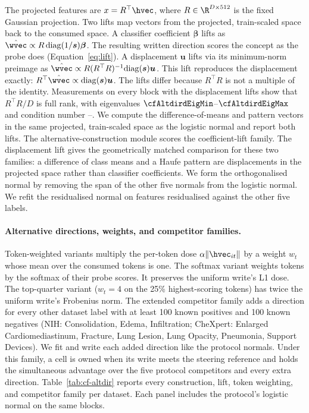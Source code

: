 \documentclass{article}
\begin{document}
The projected features are $x=R^{\top}\hvec$, where $R\in\R^{D\times512}$ is the fixed Gaussian projection. Two lifts map vectors from the projected, train-scaled space back to the consumed space. A classifier coefficient $\boldsymbol\beta$ lifts as $\hat\wvec\propto R\,\mathrm{diag}(1/\boldsymbol s)\boldsymbol\beta$. The resulting written direction scores the concept as the probe does (Equation~\ref{eq:lift}). A displacement $\boldsymbol u$ lifts via its minimum-norm preimage as $\hat\wvec\propto R(R^{\top}R)^{-1}\mathrm{diag}(\boldsymbol s)\boldsymbol u$. This lift reproduces the displacement exactly: $R^{\top}\hat\wvec\propto\mathrm{diag}(\boldsymbol s)\boldsymbol u$. The lifts differ because $R^{\top}R$ is not a multiple of the identity. Measurements on every block with the displacement lifts show that $R^{\top}R/D$ is full rank, with eigenvalues $\cfAltdirdEigMin$--$\cfAltdirdEigMax$ and condition number \cfAltdirdCondMin{}--\cfAltdirdCondMax{}. We compute the difference-of-means and pattern vectors in the same projected, train-scaled space as the logistic normal and report both lifts. The alternative-construction module scores the coefficient-lift family. The displacement lift gives the geometrically matched comparison for these two families: a difference of class means and a Haufe pattern are displacements in the projected space rather than classifier coefficients. We form the orthogonalised normal by removing the span of the other five normals from the logistic normal. We refit the residualised normal on features residualised against the other five labels.

\paragraph{Alternative directions, weights, and competitor families.} Token-weighted variants multiply the per-token dose $\alpha\lVert\hvec_{it}\rVert$ by a weight $w_t$ whose mean over the consumed tokens is one. The softmax variant weights tokens by the softmax of their probe scores. It preserves the uniform write's L1 dose. The top-quarter variant ($w_t=4$ on the 25\% highest-scoring tokens) has twice the uniform write's Frobenius norm. The extended competitor family adds a direction for every other dataset label with at least 100 known positives and 100 known negatives (NIH: Consolidation, Edema, Infiltration; CheXpert: Enlarged Cardiomediastinum, Fracture, Lung Lesion, Lung Opacity, Pneumonia, Support Devices). We fit and write each added direction like the protocol normals. Under this family, a cell is owned when its write meets the steering reference and holds the simultaneous advantage over the five protocol competitors and every extra direction. Table~\ref{tab:cf-altdir} reports every construction, lift, token weighting, and competitor family per dataset. Each panel includes the protocol's logistic normal on the same blocks.
\end{document}
